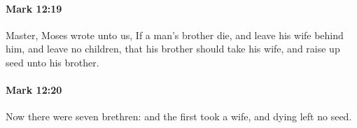		\paragraph{Mark 12:19} %
			\label{MARK-12-19}

			Master, Moses wrote unto us, If a man's brother die, and leave his wife behind him, and leave no children, that his brother should take his wife, and raise up seed unto his brother.

			\begin{framed}
			\scriptsize
				\begin{compactdesc}
					\item[SBLG] 
				\end{compactdesc}
			\end{framed}

		\paragraph{Mark 12:20} %
			\label{MARK-12-20}

			Now there were seven brethren: and the first took a wife, and dying left no seed.

